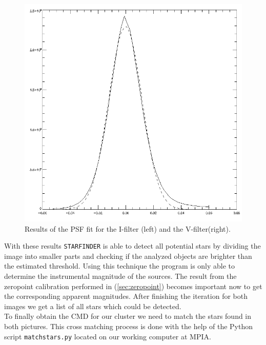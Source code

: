 \begin{figure}[H]
\begin{minipage}{0.2\textwidth}
\vspace{3pt}
\hspace{15pt}
		\includegraphics[scale=0.148]{figures/Exposures/psf_noise_V.png}
\end{minipage}
\caption[Results of the PSF fit]{Results of the PSF fit for the I-filter (left) and the V-filter(right).} 
\end{figure} 

With these results \texttt{STARFINDER} is able to detect all potential stars by dividing the image into smaller parts and checking if the analyzed objects are brighter than the estimated threshold. 
Using this technique the program is only able to determine the instrumental magnitude of the sources. The result from the zeropoint calibration performed in (\ref{sec:zeropoint}) becomes important now to get the corresponding apparent magnitudes.
After finishing the iteration for both images we get a list of all stars which could be detected. \\
To finally obtain the CMD for our cluster we need to match the stars found in both pictures. This cross matching process is done with the help of the Python script \texttt{matchstars.py} located on our working computer at MPIA. \\ 

